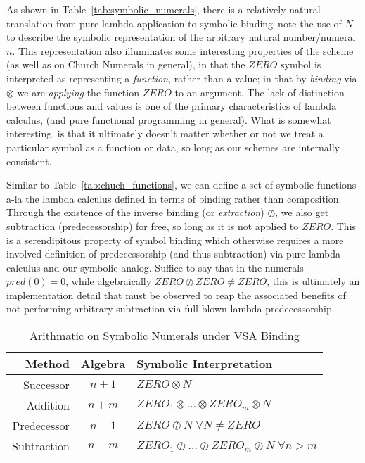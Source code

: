 \documentclass{report}
\begin{document}
As shown in Table~\ref{tab:symbolic_numerals}, there is a relatively natural translation from pure lambda application to symbolic binding--note the use of $N$ to describe the symbolic representation of the arbitrary natural number/numeral $n$.
This representation also illuminates some interesting properties of the scheme (as well as on Church Numerals in general), in that the $ZERO$ symbol is interpreted as representing a \emph{function}, rather than a value; in that by \emph{binding} via $\otimes$ we are \emph{applying} the function $ZERO$ to an argument.
The lack of distinction between functions and values is one of the primary characteristics of lambda calculus, (and pure functional programming in general).
What is somewhat interesting, is that it ultimately doesn\rq{}t matter whether or not we treat a particular symbol as a function or data, so long as our schemes are internally consistent.

Similar to Table~\ref{tab:chuch_functions}, we can define a set of symbolic functions a-la the lambda calculus defined in terms of binding rather than composition.
Through the existence of the inverse binding (or \emph{extraction}) $\oslash$, we also get subtraction (predecessorship) for free, so long as it is not applied to $ZERO$.
This is a serendipitous property of symbol binding which otherwise requires a more involved definition of predecessorship (and thus subtraction) via pure lambda calculus and our symbolic analog.
Suffice to say that in the numerals $pred(0) = 0$, while algebraically $ZERO\oslash ZERO \neq ZERO$, this is ultimately an implementation detail that must be observed to reap the associated benefits of not performing arbitrary subtraction via full-blown lambda predecessorship.

\begin{table}[H]
\centering
	\begin{tabular}{r | c l }
	Method		& Algebra	& Symbolic Interpretation \\ \hline
	Successor	& $n + 1$  	& $ZERO\otimes N$ 	\\
	Addition	& $n + m$  	& $ZERO_1\otimes \ldots \otimes ZERO_m \otimes N$ \\
	Predecessor & $n - 1$    & $ZERO\oslash N \; \forall N \neq ZERO$ \\
	Subtraction  & $n - m$   & $ZERO_1\oslash \ldots \oslash ZERO_m \oslash N \; \forall n > m$\\
	\end{tabular}
	\caption{Arithmatic on Symbolic Numerals under VSA Binding}
	\label{tab:symbolic_functions}
\end{table}
\end{document}
